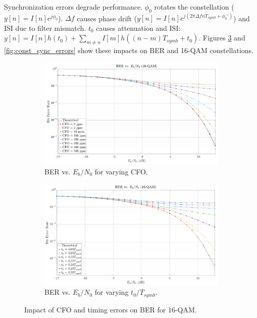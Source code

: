 \documentclass[11pt]{article}
\begin{document}
			Synchronization errors degrade performance. $\phi_0$ rotates the constellation ($y[n] = I[n]e^{j\phi_0}$). $\Delta f$ causes phase drift ($y[n] = I[n]e^{j(2\pi \Delta f nT_{symb} + \phi_0')}$) and ISI due to filter mismatch. $t_0$ causes attenuation and ISI: $y[n] = I[n]h(t_0) + \sum_{m \neq n} I[m]h((n-m)T_{symb} + t_0)$. Figures \ref{fig:ber_sync_errors} and \ref{fig:const_sync_errors} show these impacts on BER and 16-QAM constellations.
			
			\begin{figure}[H]
				\centering
				\begin{subfigure}[b]{0.48\textwidth}
					\centering
					\includegraphics[width=\linewidth]{Images/ber-cfo}
					\caption{BER vs. $E_b/N_0$ for varying CFO.}
					\label{fig:ber-cfo_compact}
				\end{subfigure}
				\hfill
				\begin{subfigure}[b]{0.48\textwidth}
					\centering
					\includegraphics[width=\linewidth]{Images/ber-timing}
					\caption{BER vs. $E_b/N_0$ for varying $t_0/T_{symb}$.}
					\label{fig:ber-timing_compact}
				\end{subfigure}
				\caption{Impact of CFO and timing errors on BER for 16-QAM.}
				\label{fig:ber_sync_errors}
			\end{figure}
			
\end{document}
